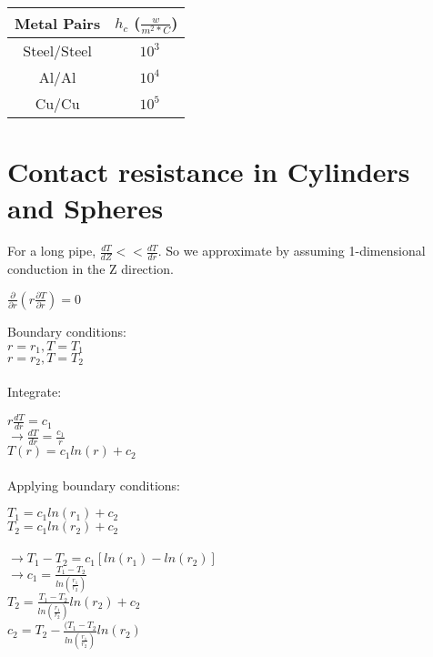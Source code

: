 \documentclass{article}
\begin{document}
\begin{center}
\begin{tabular}{||c c||} 
 \hline
 Metal Pairs & $h_c$ ($\frac{w}{m^2 * C}$) \\ [0.5ex] 
 \hline\hline
 Steel/Steel & ~$10^3$ \\ 
 \hline
 Al/Al & ~$10^4$ \\
 \hline
 Cu/Cu & ~$10^5$ \\
 \hline
\end{tabular}
\end{center}

\section{Contact resistance in Cylinders and Spheres}



For a long pipe, $\frac{dT}{dZ} << \frac{dT}{dr}$.
So we approximate by assuming 1-dimensional conduction in the Z direction.

$\frac{\partial}{\partial r}(r\frac{\partial T}{\partial r}) = 0$

Boundary conditions:\\
$r = r_1, T = T_1$ \\
$r = r_2, T = T_2$
\\
\\

Integrate:

$r \frac{dT}{dr} = c_1$\\

$\rightarrow \frac{dT}{dr} = \frac{c_1}{r}$\\
$T(r) = c_1 ln(r) + c_2$\\
\\

Applying boundary conditions:

$ T_1 = c_1 ln(r_1) + c_2$\\
$ T_2 = c_1 ln(r_2) + c_2$\\
\\

$\rightarrow T_1 - T_2 = c_1[ln(r_1) - ln(r_2)]$ \\
$\rightarrow c_1 = \frac{T_1 - T_2}{ln(\frac{r_1}{r_2})}$ \\
$T_2 = \frac{T_1 - T_2}{ln(\frac{r_1}{r_2})}ln(r_2) + c_2$ \\
$c_2 = T_2 - \frac{(T_1 - T_2}{ln(\frac{r_1}{r_2})} ln(r_2)$ \\
\end{document}
